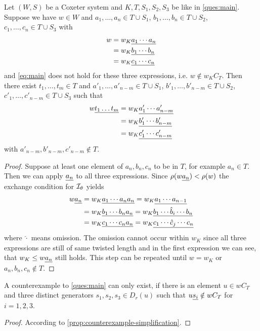 \begin{prop}
	Let $(W,S)$ be a Coxeter system and $K,T,S_1,S_2,S_3$ be like in \ref{ques:main}. Suppose we have $w \in W$ and $a_1,\ldots,a_n \in T \cup S_1$, $b_1,\ldots,b_n \in T \cup S_2$, $c_1,\ldots,c_n \in T \cup S_3$ with
	\begin{align*}
	w & = w_K \underline{ a_1 \cdots a_n } \\
	  & = w_K \underline{ b_1 \cdots b_n } \\
	  & = w_K \underline{ c_1 \cdots c_n }
	\end{align*}
	and \eqref{eq:main} does not hold for these three expressions, i.e. $w \notin w_K C_T$. Then there exist $t_1,\ldots,t_m \in T$ and $a'_1,\ldots,a'_{n-m} \in T \cup S_1$, $b'_1,\ldots,b'_{n-m} \in T \cup S_2$, $c'_1,\ldots,c'_{n-m} \in T \cup S_3$ such that
	\begin{align*}
		w \underline{t_1 \ldots t_m} & = w_K \underline{ a'_1 \cdots a'_{n-m} } \\
							   & = w_K \underline{ b'_1 \cdots b'_{n-m} } \\
							   & = w_K \underline{ c'_1 \cdots c'_{n-m} }
	\end{align*}
	with $a'_{n-m},b'_{n-m},c'_{n-m} \notin T$.

	\begin{proof}
		Suppose at least one element of $a_n,b_n,c_n$ to be in $T$, for example $a_n \in T$. Then we can apply $\underline{a_n}$ to all three expressions. Since $\rho (w \underline{a_n}) < \rho(w)$ the exchange condition for $\mathcal{I}_{\theta}$ \cite[Proposition 3.10]{hultman:comb-twisted-invo}yields
		\begin{align*}
			w \underline{a_n} & = w_K \underline{ a_1 \cdots a_n a_n } = w_K \underline{ a_1 \cdots a_{n-1} } \\
					   & = w_K \underline{ b_1 \cdots b_n a_n } = w_K \underline{ b_1 \cdots \hat b_i \cdots b_n } \\
					   & = w_K \underline{ c_1 \cdots c_n a_n } = w_K \underline{ c_1 \cdots \hat c_j \cdots c_n }
		\end{align*}
		where $\hat \cdot$ means omission. The omission cannot occur within $w_K$ since all three expressions are still of same twisted length and in the first expression we can see, that $w_K \leq w \underline{a_n}$ still holds. This step can be repeated until $w = w_K$ or $a_n,b_n,c_n \notin T$.
	\end{proof}
\end{prop}

\begin{lemm}
	A counterexample to \ref{ques:main} can only exist, if there
	is an element $u \in w C_T$ and three distinct generators $s_1,s_2,s_3 \in
	D_r(u)$ such that $u \underline{s_i} \notin w C_T$ for $i=1,2,3$.

	\begin{proof}
		According to \ref{prop:counterexample-simplification}.
	\end{proof}
\end{lemm}

